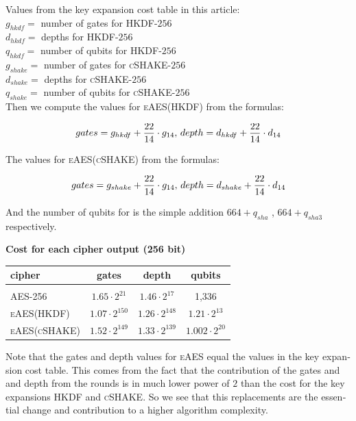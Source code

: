 \documentclass[a4paper,11pt]{article}
\begin{document}
\begin{otherlanguage}{english}
\begin{multicols}{2}
\noindent
Values from the key expansion cost table in this article: \\

\noindent
$g_{hkdf}=$  number of gates for \textsc{HKDF}-$256$ \\
$d_{hkdf}=$  depths for \textsc{HKDF}-$256$ \\
$q_{hkdf}=$  number of qubits for \textsc{HKDF}-$256$ \\
$g_{shake}=$ number of gates for \textsc{cSHAKE}-$256$ \\
$d_{shake}=$ depths for \textsc{cSHAKE}-$256$ \\
$q_{shake}=$ number of qubits for \textsc{cSHAKE}-$256$ \\

\noindent
Then we compute the values for \textsc{eAES}(\textsc{HKDF}) from the formulas:

$$\small{gates} = g_{hkdf} + \frac{22}{14} \cdot g_{14}, \,\small{depth} = d_{hkdf} + \frac{22}{14} \cdot d_{14}$$

\noindent
The values for \textsc{eAES}(\textsc{cSHAKE}) from the formulas:

$$\small{gates} = g_{shake} + \frac{22}{14} \cdot g_{14}, \,
\small{depth} = d_{shake} + \frac{22}{14} \cdot d_{14}$$

\noindent
And the number of qubits for is the simple addition $664 + q_{sha}$ , $664 + q_{sha3}$ respectively. \\

\begin{center}
\textbf{Cost for each cipher output (256 bit)} \\
\vspace{0.2cm}
  \begin{tabular}{l|c|c|c}
  cipher &  gates & depth & qubits \\ 
  \hline
    &  &  & \\ [-8pt]
  \textsc{AES}-256 & $1.65 \cdot 2^{21}$  &  $1.46 \cdot 2^{17}$ & 1,336 \\
  \small{\textsc{eAES}(\tiny{\textsc{HKDF}})} & $1.07 \cdot 2^{150}$ & $1.26 \cdot 2^{148}$ & $1.21 \cdot 2^{13}$  \\  
  \small{\textsc{eAES}(\tiny{\textsc{cSHAKE}})} & $1.52 \cdot 2^{149}$ & $1.33 \cdot 2^{139}$ & $1.002 \cdot 2^{20}$  \\  
  \end{tabular} 
\end{center}

\noindent
Note that the gates and depth values for \textsc{eAES} equal the values in the key expansion cost table. This comes from the fact that the contribution of the gates and and depth from the rounds is in much lower power of $2$ than the cost for the key expansions \textsc{HKDF} and \textsc{cSHAKE}. So we see that this replacements are the essential change and contribution to a higher algorithm complexity. \\


\end{multicols}
\end{otherlanguage}
\end{document}
